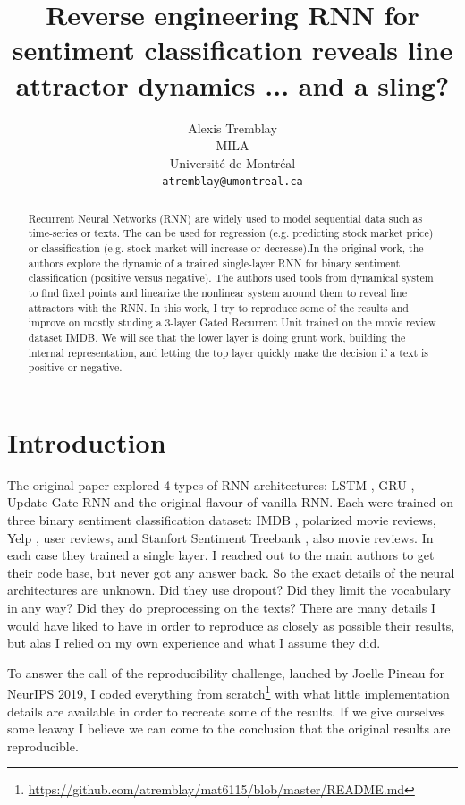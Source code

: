 \documentclass{article}
\title{Reverse engineering RNN for sentiment classification reveals line attractor dynamics ... and a sling?}
\author{%
  Alexis Tremblay \\
  MILA\\
  Université de Montréal\\
  \texttt{atremblay@umontreal.ca} \\
}
\begin{document}
\maketitle

\begin{abstract} 
  Recurrent Neural Networks (RNN) are widely used to model sequential data such as
  time-series or texts. The can be used for regression (e.g. predicting stock market
  price) or classification (e.g. stock market will increase or decrease).In the 
  original work, the authors explore the dynamic of a trained single-layer RNN 
  for binary sentiment classification (positive versus negative). The authors used tools
  from dynamical system to find fixed points and linearize the nonlinear system around them
  to reveal line attractors with the RNN. In this work, I try to reproduce some of the results
  and improve on mostly studing a 3-layer Gated Recurrent Unit trained on the movie review dataset
  IMDB. We will see that the lower layer is doing grunt work, building the internal 
  representation, and letting the top layer quickly make the decision if a text is 
  positive or negative.
\end{abstract}

\section{Introduction}
The original paper explored 4 types of RNN architectures: LSTM \cite{lstm}, GRU \cite{cho2014learning}, Update Gate RNN \cite{collins2016capacity} and the original flavour of vanilla RNN. Each were trained on three binary sentiment classification dataset: IMDB \cite{IMDB}, polarized movie reviews, Yelp \cite{zhang2015characterlevel}, user reviews, and Stanfort Sentiment Treebank \cite{socher-etal-2013-recursive}, also movie reviews. In each case they trained a single layer. I reached out to the main authors to get their code base, but never got any answer back. So the exact details of the neural architectures are unknown. Did they use dropout? Did they limit the vocabulary in any way? Did they do preprocessing on the texts? There are many details I would have liked to have in order to reproduce as closely as possible their results, but alas I relied on my own experience and what I assume they did. 

To answer the call of the reproducibility challenge, lauched by Joelle Pineau for NeurIPS 2019, I coded everything from scratch\footnote{\url{https://github.com/atremblay/mat6115/blob/master/README.md}} with what little implementation details are available in order to recreate some of the results. If we give ourselves some leaway I believe we can come to the conclusion that the original results are reproducible. 
\end{document}
